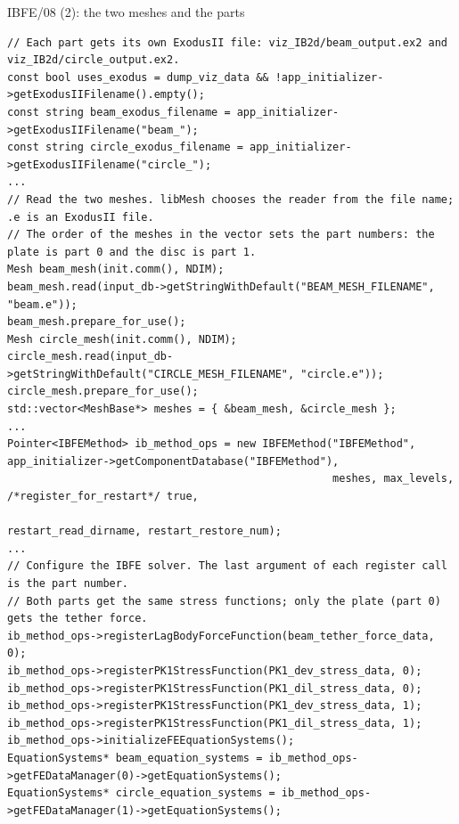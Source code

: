 \documentclass[aspectratio=169,11pt]{beamer}
\begin{document}
\begin{frame}[fragile]{IBFE/08 (2): the two meshes and the parts}
\label{fr:code}
\begin{lstlisting}[style=cpptiny]
// Each part gets its own ExodusII file: viz_IB2d/beam_output.ex2 and viz_IB2d/circle_output.ex2.
const bool uses_exodus = dump_viz_data && !app_initializer->getExodusIIFilename().empty();
const string beam_exodus_filename = app_initializer->getExodusIIFilename("beam_");
const string circle_exodus_filename = app_initializer->getExodusIIFilename("circle_");
...
// Read the two meshes. libMesh chooses the reader from the file name; .e is an ExodusII file.
// The order of the meshes in the vector sets the part numbers: the plate is part 0 and the disc is part 1.
Mesh beam_mesh(init.comm(), NDIM);
beam_mesh.read(input_db->getStringWithDefault("BEAM_MESH_FILENAME", "beam.e"));
beam_mesh.prepare_for_use();
Mesh circle_mesh(init.comm(), NDIM);
circle_mesh.read(input_db->getStringWithDefault("CIRCLE_MESH_FILENAME", "circle.e"));
circle_mesh.prepare_for_use();
std::vector<MeshBase*> meshes = { &beam_mesh, &circle_mesh };
...
Pointer<IBFEMethod> ib_method_ops = new IBFEMethod("IBFEMethod", app_initializer->getComponentDatabase("IBFEMethod"),
                                                   meshes, max_levels, /*register_for_restart*/ true,
                                                   restart_read_dirname, restart_restore_num);
...
// Configure the IBFE solver. The last argument of each register call is the part number.
// Both parts get the same stress functions; only the plate (part 0) gets the tether force.
ib_method_ops->registerLagBodyForceFunction(beam_tether_force_data, 0);
ib_method_ops->registerPK1StressFunction(PK1_dev_stress_data, 0);
ib_method_ops->registerPK1StressFunction(PK1_dil_stress_data, 0);
ib_method_ops->registerPK1StressFunction(PK1_dev_stress_data, 1);
ib_method_ops->registerPK1StressFunction(PK1_dil_stress_data, 1);
ib_method_ops->initializeFEEquationSystems();
EquationSystems* beam_equation_systems = ib_method_ops->getFEDataManager(0)->getEquationSystems();
EquationSystems* circle_equation_systems = ib_method_ops->getFEDataManager(1)->getEquationSystems();
\end{lstlisting}
\end{frame}
\end{document}
